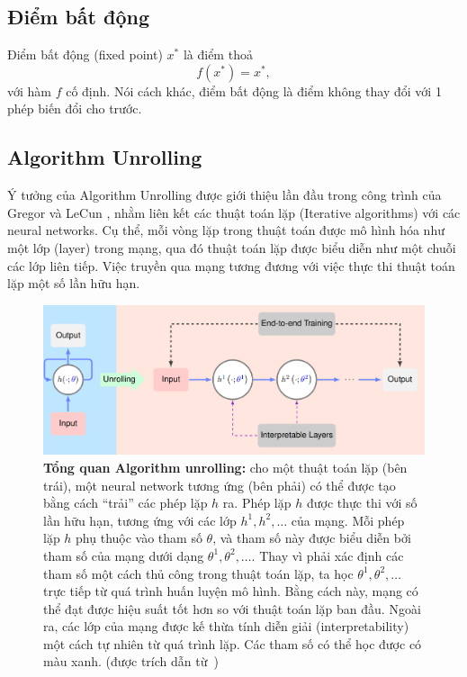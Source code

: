 \subsection{Điểm bất động}
Điểm bất động (fixed point) $x^*$ là điểm thoả 
\[
    f(x^*) = x^*,
\]
với hàm $f$ cố định. Nói cách khác, điểm bất động là điểm không thay đổi với 1 phép biến đổi cho trước.


\subsection{Algorithm Unrolling}
Ý tưởng của Algorithm Unrolling được giới thiệu lần đầu trong công trình của Gregor và LeCun \cite{gregor2010unroll}, nhằm liên kết các thuật toán lặp (Iterative algorithms) với các neural networks. Cụ thể, mỗi vòng lặp trong thuật toán được mô hình hóa như một lớp (layer) trong mạng, qua đó thuật toán lặp được biểu diễn như một chuỗi các lớp liên tiếp. Việc truyền qua mạng tương đương với việc thực thi thuật toán lặp một số lần hữu hạn.

\begin{figure}[h]
    \centering
    \includegraphics[width=\textwidth]{img/unrolling.png}
    \caption{
        \textbf{Tổng quan Algorithm unrolling:} cho một thuật toán lặp (bên trái), một neural network tương ứng (bên phải) có thể được tạo bằng cách ``trải'' các phép lặp $h$ ra. 
        Phép lặp $h$ 
        được thực thi với số lần hữu hạn, tương ứng với các lớp $h^1, h^2, \dots$ của mạng. Mỗi phép lặp $h$ phụ thuộc vào tham số $\theta$, và tham số này được 
        biểu diễn bởi tham số của
        mạng dưới dạng $\theta^1, \theta^2, \dots$. Thay vì phải xác định các tham số một cách thủ công trong thuật toán lặp, ta học $\theta^1, \theta^2, \dots$ trực tiếp từ quá trình huấn luyện mô hình. Bằng cách này, mạng có thể đạt được hiệu suất tốt hơn so với thuật toán lặp ban đầu. Ngoài ra, các lớp của mạng được kế thừa tính diễn giải (interpretability) một cách tự nhiên từ quá trình lặp.
        Các tham số có thể học được có màu xanh.
        (được trích dẫn từ~\cite{monga2021unroll})
    }
    \label{fig:unrolling}
\end{figure}
